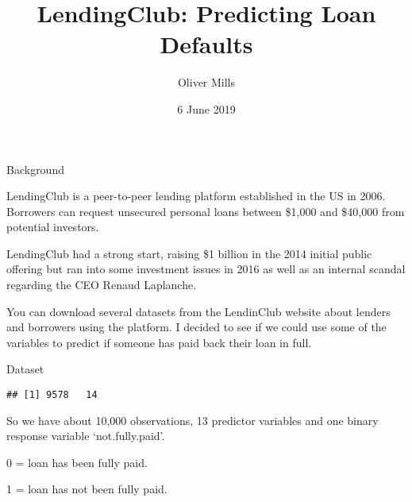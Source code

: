 \documentclass[ignorenonframetext,]{beamer}
\title{LendingClub: Predicting Loan Defaults}
\author{Oliver Mills}
\date{6 June 2019}
\begin{document}
\frame{\titlepage}

\begin{frame}{Background}

LendingClub is a peer-to-peer lending platform established in the US in
2006. Borrowers can request unsecured personal loans between \$1,000 and
\$40,000 from potential investors.

LendingClub had a strong start, raising \$1 billion in the 2014 initial
public offering but ran into some investment issues in 2016 as well as
an internal scandal regarding the CEO Renaud Laplanche.

You can download several datasets from the LendinClub website about
lenders and borrowers using the platform. I decided to see if we could
use some of the variables to predict if someone has paid back their loan
in full.

\end{frame}

\begin{frame}[fragile]{Dataset}

\begin{verbatim}
## [1] 9578   14
\end{verbatim}

So we have about 10,000 observations, 13 predictor variables and one
binary response variable `not.fully.paid'.

0 = loan has been fully paid.

1 = loan has not been fully paid.

\end{frame}
\end{document}
